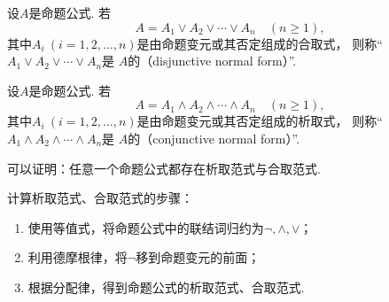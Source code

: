 \begin{definition}
设\(A\)是命题公式.
若\begin{equation*}
	A = A_1 \lor A_2 \lor \dotsb \lor A_n
	\quad(n\geq1),
\end{equation*}
其中\(A_i\ (i=1,2,\dotsc,n)\)是由命题变元或其否定组成的合取式，
则称“\(A_1 \lor A_2 \lor \dotsb \lor A_n\)是
\(A\)的（disjunctive normal form）”.
\end{definition}

\begin{definition}
设\(A\)是命题公式.
若\begin{equation*}
	A = A_1 \land A_2 \land \dotsb \land A_n
	\quad(n\geq1),
\end{equation*}
其中\(A_i\ (i=1,2,\dotsc,n)\)是由命题变元或其否定组成的析取式，
则称“\(A_1 \land A_2 \land \dotsb \land A_n\)是
\(A\)的（conjunctive normal form）”.
\end{definition}

可以证明：任意一个命题公式都存在析取范式与合取范式.

计算析取范式、合取范式的步骤：\begin{enumerate}
	\item 使用等值式，将命题公式中的联结词归约为\(\neg,\land,\lor\)；
	\item 利用德摩根律，将\(\neg\)移到命题变元的前面；
	\item 根据分配律，得到命题公式的析取范式、合取范式.
\end{enumerate}

